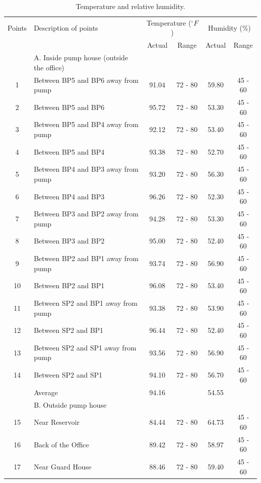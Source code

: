 \begin{table}[!h]
	\caption{Temperature and relative humidity.}
	\label{ch04_tbl_wem01}
	{\footnotesize
\begin{tabular}{c|l|c|c|c|c}
	\hline
	Points & Description of points & \multicolumn{2}{c|}{Temperature ($^\circ F$)} & \multicolumn{2}{c}{Humidity (\%)} \\ 
	\cline{3-6}
	&  & Actual & Range & Actual & Range \\ 
	\hline
	& A. Inside pump house (outside the office) &  &  &  &  \\ 
	1 & Between BP5 and BP6 away from pump & 91.04 & 72 - 80 & 59.80 & 45 - 60 \\ 
	2 & Between BP5 and BP6 & 95.72 & 72 - 80 & 53.30 & 45 - 60 \\ 
	3 & Between BP5 and BP4 away from pump & 92.12 & 72 - 80 & 53.40 & 45 - 60 \\ 
	4 & Between BP5 and BP4 & 93.38 & 72 - 80 & 52.70 & 45 - 60 \\ 
	5 & Between BP4 and BP3 away from pump & 93.20 & 72 - 80 & 56.30 & 45 - 60 \\ 
	6 & Between BP4 and BP3 & 96.26 & 72 - 80 & 52.30 & 45 - 60 \\ 
	7 & Between BP3 and BP2 away from pump & 94.28 & 72 - 80 & 53.30 & 45 - 60 \\ 
	8 & Between BP3 and BP2 & 95.00 & 72 - 80 & 52.40 & 45 - 60 \\ 
	9 & Between BP2 and BP1 away from pump & 93.74 & 72 - 80 & 56.90 & 45 - 60 \\ 
	10 & Between BP2 and BP1 & 96.08 & 72 - 80 & 53.40 & 45 - 60 \\ 
	11 & Between SP2 and BP1 away from pump & 93.38 & 72 - 80 & 53.90 & 45 - 60 \\ 
	12 & Between SP2 and BP1 & 96.44 & 72 - 80 & 52.40 & 45 - 60 \\ 
	13 & Between SP2 and SP1 away from pump & 93.56 & 72 - 80 & 56.90 & 45 - 60 \\ 
	14 & Between SP2 and SP1 & 94.10 & 72 - 80 & 56.70 & 45 - 60 \\ 
	& Average & 94.16 &  & 54.55 &  \\ 
	\hline
	& B. Outside pump house &  &  &  &  \\ 
	15 & Near Reservoir & 84.44 & 72 - 80 & 64.73 & 45 - 60 \\ 
	16 & Back of the Office & 89.42 & 72 - 80 & 58.97 & 45 - 60 \\ 
	17 & Near Guard House & 88.46 & 72 - 80 & 59.40 & 45 - 60 \\ 

\end{tabular}}
\end{table}
